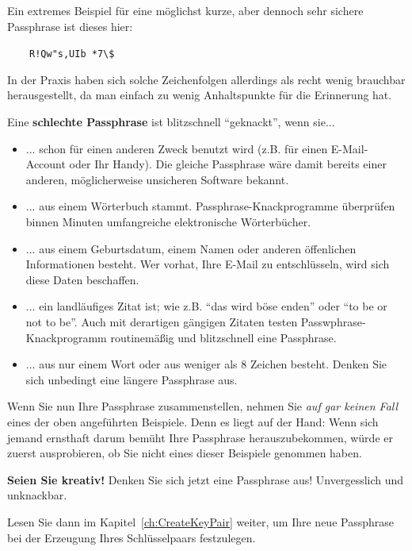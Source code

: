 \documentclass[a4paper,11pt, oneside,openright,titlepage,dvips]{scrbook}
\newcommand{\Email}{E-Mail}
\begin{document}
Ein extremes Beispiel für eine möglichst kurze, aber dennoch sehr
sichere Passphrase ist dieses hier:

$\qquad$\verb-R!Qw"s,UIb *7\$-

In der Praxis haben sich solche Zeichenfolgen allerdings als recht
wenig brauchbar herausgestellt, da man einfach zu wenig Anhaltspunkte
für die Erinnerung hat.

\clearpage
Eine \textbf{schlechte Passphrase} ist blitzschnell "`geknackt"', wenn
sie...

\begin{itemize}
\item ... schon für einen anderen Zweck benutzt wird (z.B. für einen
  \Email{}-Account oder Ihr Handy). Die gleiche Passphrase wäre damit
  bereits einer anderen, möglicherweise unsicheren Software bekannt.

\item ... aus einem Wörterbuch stammt. Passphrase-Knackprogramme
    überprüfen binnen Minuten umfangreiche elektronische Wörterbücher.

\item ... aus einem Geburtsdatum, einem Namen oder anderen öffenlichen
    Informationen besteht. Wer vorhat, Ihre \Email{}
    zu entschlüsseln, wird sich diese Daten beschaffen.

\item ... ein landläufiges Zitat ist; wie z.B. "`das wird böse enden"' oder "`to
  be or not to be"'. Auch mit derartigen gängigen Zitaten testen
  Passwphrase-Knackprogramm routinemäßig und blitzschnell eine Passphrase.

\item ... aus nur einem Wort oder aus weniger als 8 Zeichen besteht.
  Denken Sie sich unbedingt eine längere Passphrase aus.

\end{itemize}

Wenn Sie nun Ihre Passphrase zusammenstellen, nehmen Sie
\textit{auf gar keinen Fall} eines der oben angeführten Beispiele.  Denn es liegt auf
der Hand: Wenn sich jemand ernsthaft darum bemüht Ihre
Passphrase herauszubekommen, würde er zuerst ausprobieren, ob Sie
nicht eines dieser Beispiele genommen haben.

\bigskip

\textbf{Seien Sie kreativ!} Denken Sie sich jetzt eine Passphrase aus!
Unvergesslich und unknackbar.

Lesen Sie dann im Kapitel~\ref{ch:CreateKeyPair} weiter, um Ihre neue
Passphrase bei der Erzeugung Ihres Schlüsselpaars festzulegen.
\end{document}
